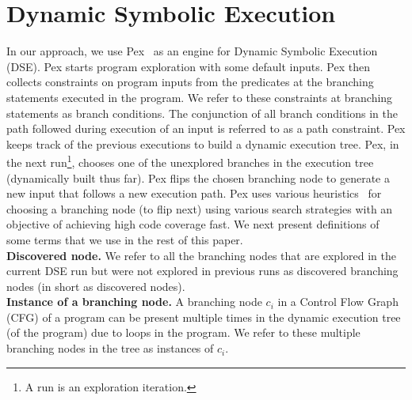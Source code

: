 \section{Dynamic Symbolic Execution}
In our approach, we use Pex~\cite{Pex} as an engine for Dynamic Symbolic Execution (DSE). Pex starts program exploration with some default inputs. Pex then collects constraints on program inputs from the predicates at the branching statements executed in the program. We refer to these constraints at branching statements as branch conditions. 
The conjunction of all branch conditions in the path followed during execution of an input is referred to as a path constraint. Pex keeps track of the previous executions to build a dynamic execution tree. Pex, in the next run\footnote{\scriptsize{A run is an exploration iteration.}}, chooses one of the unexplored branches in the execution tree (dynamically built thus far). Pex flips the chosen branching node to generate a new input that follows a new execution path. 
Pex uses various heuristics~\cite{fitnex} for choosing a branching node (to flip next) using various search strategies with an objective of achieving high code coverage fast. We next present definitions of some terms that we use in the rest of this paper.
\\ \textbf{Discovered node. }We refer to all the branching nodes that are explored in the current DSE run but were not explored in previous runs as discovered branching nodes (in short as discovered nodes).
\\ \textbf{Instance of a branching node. }A branching node $c_i$ in a Control Flow Graph (CFG) of a program can be present multiple times in the dynamic execution tree (of the program) due to loops in the program. We refer to these multiple branching nodes in the tree as instances of $c_i$.
 
